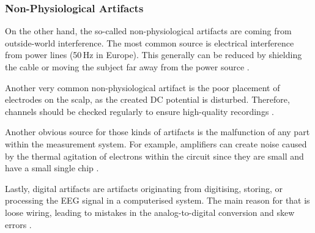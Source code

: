       \subsubsection{Non-Physiological Artifacts}
        On the other hand, the so-called non-physiological artifacts are coming from outside-world interference. The most common source is electrical interference from power lines (50\,Hz in Europe). This generally can be reduced by shielding the cable or moving the subject far away from the power source \cite{hu2019eeg}.\par
        Another very common non-physiological artifact is the poor placement of electrodes on the scalp, as the created DC potential is disturbed. Therefore, channels should be checked regularly to ensure high-quality recordings \cite{hu2019eeg}. \par
        Another obvious source for those kinds of artifacts is the malfunction of any part within the measurement system. For example, amplifiers can create noise caused by the thermal agitation of electrons within the circuit since they are small and have a small single chip \cite{hu2019eeg}. \par
        Lastly, digital artifacts are artifacts originating from digitising, storing, or processing the EEG signal in a computerised system. The main reason for that is loose wiring, leading to mistakes in the analog-to-digital conversion and skew errors \cite{hu2019eeg}. \par
